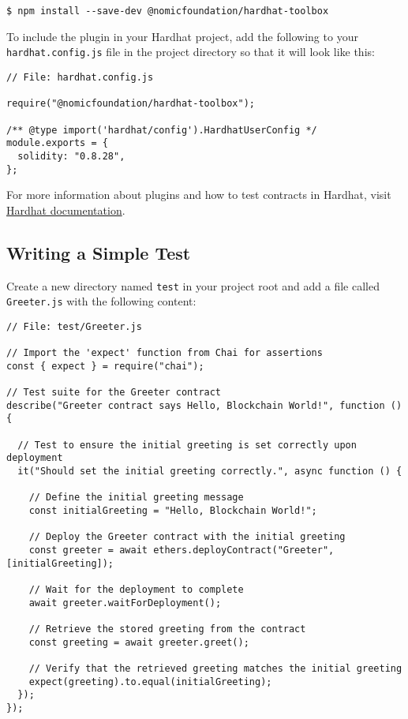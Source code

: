 \documentclass[12pt]{article}
\begin{document}
\begin{verbatim}
$ npm install --save-dev @nomicfoundation/hardhat-toolbox
\end{verbatim}

\noindent
To include the plugin in your Hardhat project, add the following to your \texttt{hardhat.config.js} file in the project directory so that it will look like this:

\begin{verbatim}
// File: hardhat.config.js

require("@nomicfoundation/hardhat-toolbox");

/** @type import('hardhat/config').HardhatUserConfig */
module.exports = {
  solidity: "0.8.28",
};
\end{verbatim}
For more information about plugins and how to test contracts in Hardhat, visit \\ \href{https://hardhat.org/tutorial/testing-contracts}{Hardhat documentation}.

\subsection{Writing a Simple Test}

Create a new directory named \texttt{test} in your project root and add a file called \texttt{Greeter.js} with the following content:

\noindent
\begin{minipage}[c]{\textwidth}
\begin{verbatim}
// File: test/Greeter.js

// Import the 'expect' function from Chai for assertions
const { expect } = require("chai");

// Test suite for the Greeter contract
describe("Greeter contract says Hello, Blockchain World!", function () {
  
  // Test to ensure the initial greeting is set correctly upon deployment
  it("Should set the initial greeting correctly.", async function () {
    
    // Define the initial greeting message
    const initialGreeting = "Hello, Blockchain World!";
    
    // Deploy the Greeter contract with the initial greeting
    const greeter = await ethers.deployContract("Greeter", [initialGreeting]);
    
    // Wait for the deployment to complete
    await greeter.waitForDeployment();

    // Retrieve the stored greeting from the contract
    const greeting = await greeter.greet();

    // Verify that the retrieved greeting matches the initial greeting
    expect(greeting).to.equal(initialGreeting);
  });
});
\end{verbatim}
\end{minipage}
\end{document}
